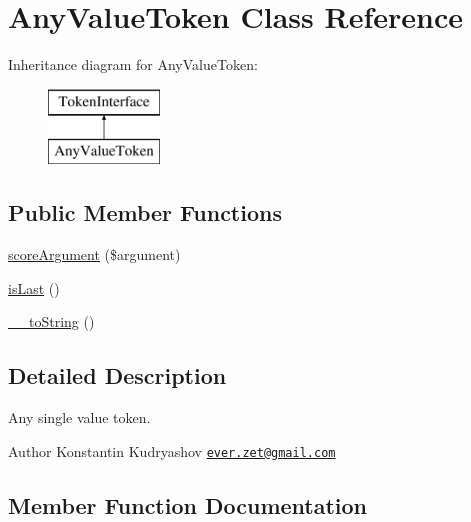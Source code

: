 \hypertarget{class_prophecy_1_1_argument_1_1_token_1_1_any_value_token}{}\section{Any\+Value\+Token Class Reference}
\label{class_prophecy_1_1_argument_1_1_token_1_1_any_value_token}
Inheritance diagram for Any\+Value\+Token\+:\begin{figure}[H]
\begin{center}
\leavevmode
\includegraphics[height=2.000000cm]{class_prophecy_1_1_argument_1_1_token_1_1_any_value_token}
\end{center}
\end{figure}
\subsection*{Public Member Functions}
\begin{DoxyCompactItemize}
\item 
\mbox{\hyperlink{class_prophecy_1_1_argument_1_1_token_1_1_any_value_token_a8d5bf47ab6eaa935458d5ad160e52822}{score\+Argument}} (\$argument)
\item 
\mbox{\hyperlink{class_prophecy_1_1_argument_1_1_token_1_1_any_value_token_ac72b8349b1340887fc1af30eca2b951c}{is\+Last}} ()
\item 
\mbox{\hyperlink{class_prophecy_1_1_argument_1_1_token_1_1_any_value_token_a7516ca30af0db3cdbf9a7739b48ce91d}{\+\_\+\+\_\+to\+String}} ()
\end{DoxyCompactItemize}


\subsection{Detailed Description}
Any single value token.

\begin{DoxyAuthor}{Author}
Konstantin Kudryashov \href{mailto:ever.zet@gmail.com}{\tt ever.\+zet@gmail.\+com} 
\end{DoxyAuthor}


\subsection{Member Function Documentation}
\mbox{\label{class_prophecy_1_1_argument_1_1_token_1_1_any_value_token_a7516ca30af0db3cdbf9a7739b48ce91d}} 
